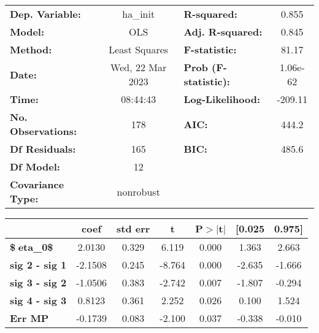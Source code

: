 \begin{center}
\begin{tabular}{lclc}
\toprule
\textbf{Dep. Variable:}    &     ha\_init     & \textbf{  R-squared:         } &    0.855  \\
\textbf{Model:}            &       OLS        & \textbf{  Adj. R-squared:    } &    0.845  \\
\textbf{Method:}           &  Least Squares   & \textbf{  F-statistic:       } &    81.17  \\
\textbf{Date:}             & Wed, 22 Mar 2023 & \textbf{  Prob (F-statistic):} & 1.06e-62  \\
\textbf{Time:}             &     08:44:43     & \textbf{  Log-Likelihood:    } &  -209.11  \\
\textbf{No. Observations:} &         178      & \textbf{  AIC:               } &    444.2  \\
\textbf{Df Residuals:}     &         165      & \textbf{  BIC:               } &    485.6  \\
\textbf{Df Model:}         &          12      & \textbf{                     } &           \\
\textbf{Covariance Type:}  &    nonrobust     & \textbf{                     } &           \\
\bottomrule
\end{tabular}
\end{center}\begin{center}
\begin{tabular}{lcccccc}
\toprule
                                & \textbf{coef} & \textbf{std err} & \textbf{t} & \textbf{P$> |$t$|$} & \textbf{[0.025} & \textbf{0.975]}  \\
\midrule
\textbf{\$eta\_{0}\$}          &       2.0130  &        0.329     &     6.119  &         0.000        &        1.363    &        2.663     \\
\textbf{sig 2 - sig 1}          &      -2.1508  &        0.245     &    -8.764  &         0.000        &       -2.635    &       -1.666     \\
\textbf{sig 3 - sig 2}          &      -1.0506  &        0.383     &    -2.742  &         0.007        &       -1.807    &       -0.294     \\
\textbf{sig 4 - sig 3}          &       0.8123  &        0.361     &     2.252  &         0.026        &        0.100    &        1.524     \\
\textbf{Err MP}                 &      -0.1739  &        0.083     &    -2.100  &         0.037        &       -0.338    &       -0.010     \\

\end{tabular}
\end{center}
